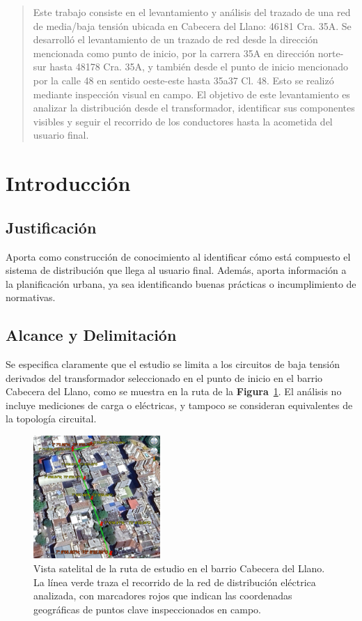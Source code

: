 \begin{abstract}
Este trabajo consiste en el levantamiento y análisis del trazado de una red de media/baja tensión ubicada en Cabecera del Llano: 46181 Cra. 35A. Se desarrolló el levantamiento de un trazado de red desde la dirección mencionada como punto de inicio, por la carrera 35A en dirección norte-sur hasta 48178 Cra. 35A, y también desde el punto de inicio mencionado por la calle 48 en sentido oeste-este hasta 35a37 Cl. 48. Esto se realizó mediante inspección visual en campo. El objetivo de este levantamiento es analizar la distribución desde el transformador, identificar sus componentes visibles y seguir el recorrido de los conductores hasta la acometida del usuario final.
\end{abstract}

\section{Introducción}

\subsection{Justificación}
Aporta como construcción de conocimiento al identificar cómo está compuesto el sistema de distribución que llega al usuario final. Además, aporta información a la planificación urbana, ya sea identificando buenas prácticas o incumplimiento de normativas.

\subsection{Alcance y Delimitación}
Se especifica claramente que el estudio se limita a los circuitos de baja tensión derivados del transformador seleccionado en el punto de inicio en el barrio Cabecera del Llano, como se muestra en la ruta de la \textbf{Figura}~\ref{fig:ruta_estudio}. El análisis no incluye mediciones de carga o eléctricas, y tampoco se consideran equivalentes de la topología circuital.

\begin{figure}[H]
    \centering
    \includegraphics[width=0.43\textwidth, height=0.43\textwidth]{fig_/ruta}
    \caption{Vista satelital de la ruta de estudio en el barrio Cabecera del Llano. La línea verde traza el recorrido de la red de distribución eléctrica analizada, con marcadores rojos que indican las coordenadas geográficas de puntos clave inspeccionados en campo.}
    \label{fig:ruta_estudio}
\end{figure}



